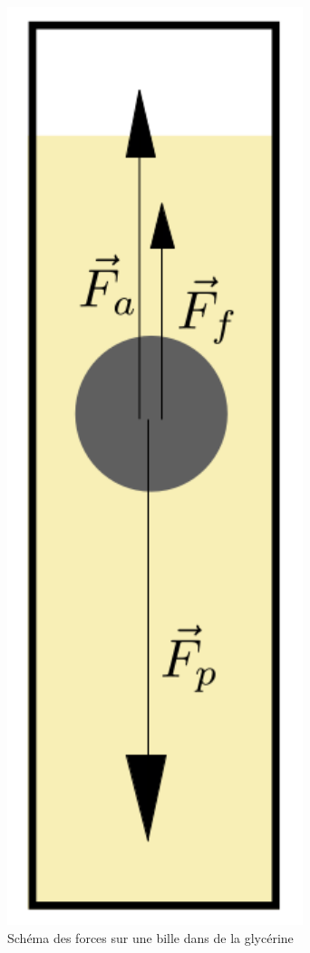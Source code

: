 \begin{minipage}{0.25\textwidth}
    \begin{figure}[H]
        \centering
        \includegraphics[scale=0.4]{graph/ballinglycsm}
        \caption{Schéma des forces sur une bille dans de la glycérine}
        \label{fig:schemaforce}
    \end{figure}
\end{minipage}